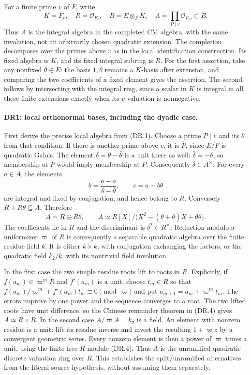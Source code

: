 \documentclass[11pt,a4paper]{article}
\numberwithin{equation}{section}
\theoremstyle{remark}\newtheorem{remark}[theorem]{Remark}
\begin{document}
For a finite prime $v$ of $F$, write
\[
 K=F_v,\quad R=\mathcal O_{F_v},\quad
 B=E\otimes_F K,\quad
 A=\prod_{P\mid v}\mathcal O_{E_P}\subset B.
 \tag{DR.2}
\]
Thus $A$ is the integral algebra in the completed CM algebra, with
the same involution, not an arbitrarily chosen quadratic extension.
The completion decomposes over the primes above $v$ as in the local
identification construction. Its fixed algebra is $K$, and its fixed
integral subring is $R$. For the first assertion, take any nonfixed
$\theta\in E$: the basis $1,\theta$ remains a $K$-basis after
extension, and comparing the two coefficients of a fixed element
gives the assertion. The second follows by intersecting with the
integral ring, since a scalar in $K$ is integral in all these finite
extensions exactly when its $v$-valuation is nonnegative.

\paragraph{DR1: local orthonormal bases, including the dyadic case.}
First derive the precise local algebra from (DR.1). Choose a prime
$P\mid v$ and its $\theta$ from that condition. If there is another
prime above $v$, it is $\bar P$, since $E/F$ is quadratic Galois.
The element $\delta=\theta-\bar\theta$ is a unit there as well:
$\bar\delta=-\delta$, so membership at $\bar P$ would imply
membership at $P$. Consequently $\delta\in A^\times$.
For every $a\in A$, the elements
\[
 b=\frac{a-\bar a}{\theta-\bar\theta},\qquad
 c=a-b\theta                                             \tag{DR.3}
\]
are integral and fixed by conjugation, and hence belong to $R$.
Conversely $R+R\theta\subseteq A$. Therefore
\[
 A=R\oplus R\theta,
 \qquad A\simeq R[X]/\bigl(X^2-(\theta+\bar\theta)X
                                  +\theta\bar\theta\bigr).
 \tag{DR.4}
\]
The coefficients lie in $R$ and the discriminant is
$\delta^2\in R^\times$. Reduction modulo a uniformizer $\varpi$
of $R$ is consequently a separable quadratic algebra over the finite
residue field $k$. It is either $k\times k$, with conjugation
exchanging the factors, or the quadratic field $k_2/k$, with its
nontrivial field involution.

In the first case the two simple residue roots lift to roots in $R$.
Explicitly, if $f(a_m)\in\varpi^mR$ and $f'(a_m)$ is a unit, choose
$t_m\in R$ so that
$f(a_m)/\varpi^m+f'(a_m)t_m\equiv0\pmod\varpi$ and put
$a_{m+1}=a_m+\varpi^m t_m$. The errors improve by one power and
the sequence converges to a root. The two lifted roots have unit
difference, so the Chinese remainder theorem in (DR.4) gives
$A\simeq R\times R$. In the second case $A/\varpi A=k_2$ is a
field. An element with nonzero residue is a unit: lift its residue
inverse and invert the resulting $1+\varpi z$ by a convergent
geometric series. Every nonzero element is then a power of
$\varpi$ times a unit, using the finite free $R$-module (DR.4).
Thus $A$ is the unramified quadratic discrete valuation ring over $R$.
This establishes the split/unramified alternatives from the literal
source hypothesis, without assuming them separately.
\end{document}
